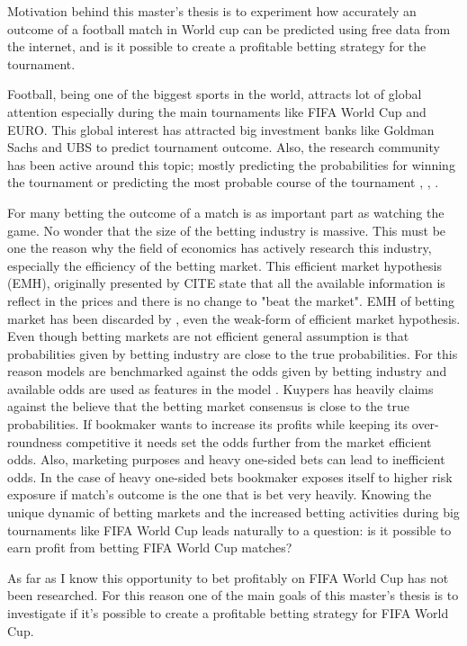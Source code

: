 Motivation behind this master's thesis is to experiment how accurately an outcome of a football match in World cup can be predicted using free data from the internet, and is it possible to create a profitable betting strategy for the tournament.

Football, being one of the biggest sports in the world, attracts lot of global attention especially during the main tournaments like FIFA World Cup and EURO. This global interest has attracted big investment banks like Goldman Sachs and UBS to predict tournament outcome. Also, the research community has been active around this topic; mostly predicting the probabilities for winning the tournament or predicting the most probable course of the tournament \cite{groll2018prediction}, \cite{groll2015prediction}, \cite{leitner2010forecasting}.

For many betting the outcome of a match is as important part as watching the game. No wonder that the size of the betting industry is massive. This must be one the reason why the field of economics has actively research this industry, especially the efficiency of the betting market. This efficient market hypothesis (EMH), originally presented by CITE state that all the available information is reflect in the prices and there is no change to "beat the market". EMH of betting market has been discarded by \cite{vlastakis2009efficient}, even the weak-form of efficient market hypothesis. Even though betting markets are not efficient general assumption is that probabilities given by betting industry are close to the true probabilities. For this reason models are benchmarked against the odds given by betting industry and available odds are used as features in the model \cite{leitner2010forecasting}. Kuypers \cite{kuypers2008} has heavily claims against the believe that the betting market consensus is close to the true probabilities. If bookmaker wants to increase its profits while keeping its over-roundness competitive it needs set the odds further from the market efficient odds. Also, marketing purposes and heavy one-sided bets can lead to inefficient odds. In the case of heavy one-sided bets bookmaker exposes itself to higher risk exposure if match's outcome is the one that is bet very heavily. Knowing the unique dynamic of betting markets and the increased betting activities during big tournaments like FIFA World Cup leads naturally to a question: is it possible to earn profit from betting FIFA World Cup matches?

As far as I know this opportunity to bet profitably on FIFA World Cup has not been researched. For this reason one of the main goals of this master's thesis is to investigate if it's possible to create a profitable betting strategy for FIFA World Cup.

